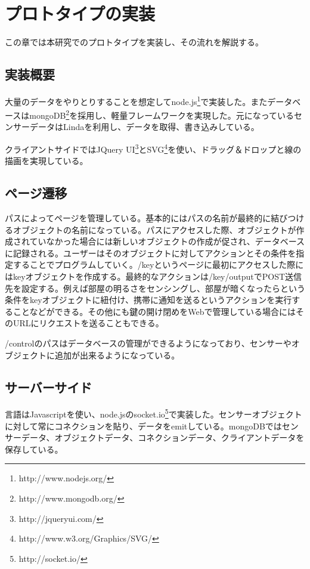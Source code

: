 \chapter{プロトタイプの実装}
\label{chap:prototype}

この章では本研究でのプロトタイプを実装し、その流れを解説する。

\section{実装概要}
大量のデータをやりとりすることを想定してnode.js\footnote{http://www.nodejs.org/}で実装した。またデータベースはmongoDB\footnote{http://www.mongodb.org/}を採用し、軽量フレームワークを実現した。元になっているセンサーデータはLindaを利用し、データを取得、書き込みしている。

クライアントサイドではJQuery UI\footnote{http://jqueryui.com/}とSVG\footnote{http://www.w3.org/Graphics/SVG/}を使い、ドラッグ＆ドロップと線の描画を実現している。

\section{ページ遷移}
パスによってページを管理している。基本的にはパスの名前が最終的に結びつけるオブジェクトの名前になっている。パスにアクセスした際、オブジェクトが作成されていなかった場合には新しいオブジェクトの作成が促され、データベースに記録される。ユーザーはそのオブジェクトに対してアクションとその条件を指定することでプログラムしていく。/keyというページに最初にアクセスした際にはkeyオブジェクトを作成する。最終的なアクションは/key/outputでPOST送信先を設定する。例えば部屋の明るさをセンシングし、部屋が暗くなったらという条件をkeyオブジェクトに紐付け、携帯に通知を送るというアクションを実行することなどができる。その他にも鍵の開け閉めをWebで管理している場合にはそのURLにリクエストを送ることもできる。

/controlのパスはデータベースの管理ができるようになっており、センサーやオブジェクトに追加が出来るようになっている。


\section{サーバーサイド}
言語はJavascriptを使い、node.jsのsocket.io\footnote{http://socket.io/}で実装した。センサーオブジェクトに対して常にコネクションを貼り、データをemitしている。mongoDBではセンサーデータ、オブジェクトデータ、コネクションデータ、クライアントデータを保存している。

